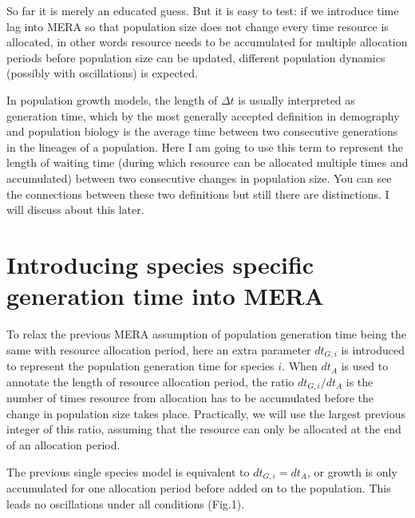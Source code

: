 \documentclass[12pt]{article}
\begin{document}
So far it is merely an educated guess. But it is easy to test: if we introduce time lag into MERA so that population size does not change every time resource is allocated, in other words resource needs to be accumulated for multiple allocation periods before population size can be updated, different population dynamics (possibly with oscillations) is expected. 

In population growth models, the length of $\Delta t$ is usually interpreted as generation time, which by the most generally accepted definition in demography and population biology is the average time between two consecutive generations in the lineages of a population. Here I am going to use this term to represent the length of waiting time (during which resource can be allocated multiple times and accumulated) between two consecutive changes in population size. You can see the connections between these two definitions but still there are distinctions. I will discuss about this later.

\section{Introducing species specific generation time into MERA}

To relax the previous MERA assumption of population generation time being the same with resource allocation period, here an extra parameter $d t_{G,i}$ is introduced to represent the population generation time for species $i$. When $d t_A$ is used to annotate the length of resource allocation period, the ratio $d t_{G,i}/d t_A$ is the number of times resource from allocation has to be accumulated before the change in population size takes place. Practically, we will use the largest previous integer of this ratio, assuming that the resource can only be allocated at the end of an allocation period.

The previous single species model is equivalent to $d t_{G,i}=d t_A$, or growth is only accumulated for one allocation period before added on to the population. This leads no oscillations under all conditions (Fig.1).
\end{document}
